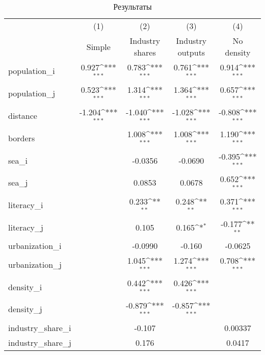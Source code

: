 {
\def\sym#1{\ifmmode^{#1}\else\(^{#1}\)\fi}
\begin{longtable}{l*{4}{c}}
\caption{Результаты\label{table:res}}\\
\hline\hline\endfirsthead\hline\endhead\hline\endfoot\endlastfoot
                    &\multicolumn{1}{c}{(1)}&\multicolumn{1}{c}{(2)}&\multicolumn{1}{c}{(3)}&\multicolumn{1}{c}{(4)}\\
                    &\multicolumn{1}{c}{Simple}&\multicolumn{1}{c}{Industry shares}&\multicolumn{1}{c}{Industry outputs}&\multicolumn{1}{c}{No density}\\
\hline
population\_i        &       0.927\sym{***}&       0.783\sym{***}&       0.761\sym{***}&       0.914\sym{***}\\
population\_j        &       0.523\sym{***}&       1.314\sym{***}&       1.364\sym{***}&       0.657\sym{***}\\
distance            &      -1.204\sym{***}&      -1.040\sym{***}&      -1.028\sym{***}&      -0.808\sym{***}\\
borders             &                     &       1.008\sym{***}&       1.008\sym{***}&       1.190\sym{***}\\
sea\_i               &                     &     -0.0356         &     -0.0690         &      -0.395\sym{***}\\
sea\_j               &                     &      0.0853         &      0.0678         &       0.652\sym{***}\\
literacy\_i          &                     &       0.233\sym{**} &       0.248\sym{**} &       0.371\sym{***}\\
literacy\_j          &                     &       0.105         &       0.165\sym{*}  &      -0.177\sym{**} \\
urbanization\_i      &                     &     -0.0990         &      -0.160         &     -0.0625         \\
urbanization\_j      &                     &       1.045\sym{***}&       1.274\sym{***}&       0.708\sym{***}\\
density\_i           &                     &       0.442\sym{***}&       0.426\sym{***}&                     \\
density\_j           &                     &      -0.879\sym{***}&      -0.857\sym{***}&                     \\
industry\_share\_i    &                     &      -0.107         &                     &     0.00337         \\
industry\_share\_j    &                     &       0.176         &                     &      0.0417         \\

\end{longtable}}
